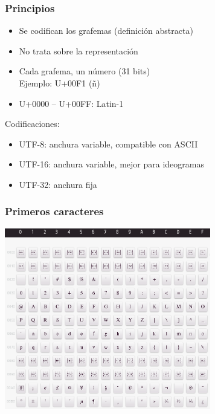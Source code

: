 \begin{frame}
\frametitle{Principios}

{\Large
\begin{itemize}
\item Se codifican los grafemas (definición abstracta)
\item No trata sobre la representación
\item Cada grafema, un número (31 bits) \\
  Ejemplo: U+00F1 (ñ) \\
\item U+0000 -- U+00FF: Latin-1
\end{itemize}

\vspace{.2cm}

Codificaciones:

\begin{itemize}
\item UTF-8: anchura variable, compatible con ASCII
\item UTF-16: anchura variable, mejor para ideogramas
\item UTF-32: anchura fija
\end{itemize}
}

\end{frame}

\begin{frame}
\frametitle{Primeros caracteres}

\begin{center}
\includegraphics[width=9cm]{figs/unicode-0000}
\end{center}

\end{frame}

